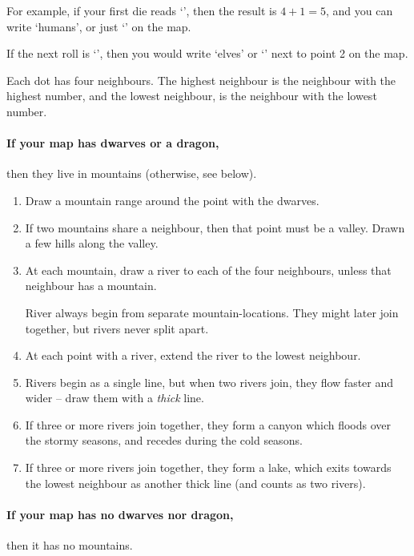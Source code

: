 \begin{multicols}{2}
\begin{multicols}{2}
\end{multicols}

\begin{exampletext}
  For example, if your first die reads `', then the result is $4+1 = 5$, and you can write `humans', or just `\Hu' on the map.

  If the next roll is `', then you would write `elves' or `\El' next to point 2 on the map.
\end{exampletext}

Each dot has four neighbours.
The highest neighbour is the neighbour with the highest number, and the lowest neighbour, is the neighbour with the lowest number.


\paragraph{If your map has dwarves or a dragon,}
then they live in mountains
(otherwise, see below).

\begin{enumerate}
  \item
  Draw a mountain range around the point with the dwarves.
  \item
  If two mountains share a neighbour, then that point must be a valley.
  Drawn a few hills along the valley.
  \item
  At each mountain, draw a river to each of the four neighbours, unless that neighbour has a mountain.

  River always begin from separate mountain-locations.
  They might later join together, but rivers never split apart.
  \item
  At each point with a river, extend the river to the lowest neighbour.
  \item
  Rivers begin as a single line, but when two rivers join, they flow faster and wider -- draw them with a \emph{thick} line.
  \item
  If three or more rivers join together, they form a canyon which floods over the stormy seasons, and recedes during the cold seasons.
  \item
  If three or more rivers join together, they form a lake, which exits towards the lowest neighbour as another thick line (and counts as two rivers).
\end{enumerate}

\paragraph{If your map has no dwarves nor dragon,}
then it has no mountains.


\end{multicols}

